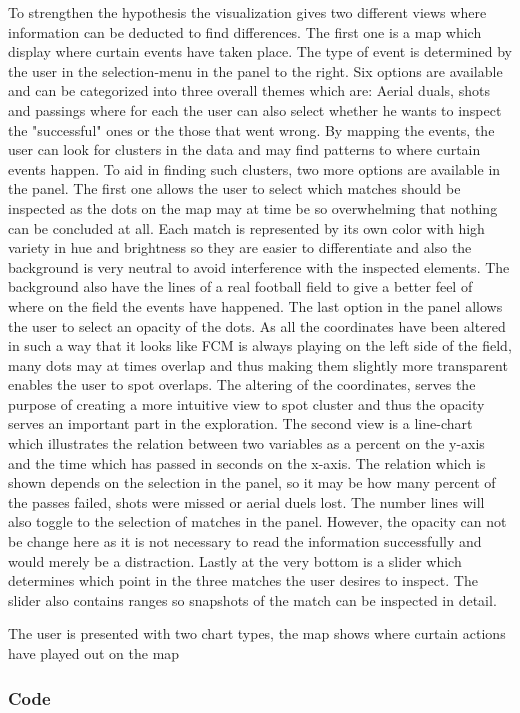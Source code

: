 \documentclass[Report.tex]{subfiles}
\begin{document}
To strengthen the hypothesis the visualization gives two different views where information can be deducted to find differences. The first one is a map which display where curtain events have taken place. The type of event is determined by the user in the selection-menu in the panel to the right. Six options are available and can be categorized into three overall themes which are: Aerial duals, shots and passings where for each the user can also select whether he wants to inspect the "successful" ones or the those that went wrong. By mapping the events, the user can look for clusters in the data and may find patterns to where curtain events happen. To aid in finding such clusters, two more options are available in the panel. The first one allows the user to select which matches should be inspected as the dots on the map may at time be so overwhelming that nothing can be concluded at all. Each match is represented by its own color with high variety in hue and brightness so they are easier to differentiate and also the background is very neutral to avoid interference with the inspected elements. The background also have the lines of a real football field to give a better feel of where on the field the events have happened. The last option in the panel allows the user to select an opacity of the dots. As all the coordinates have been altered in such a way that it looks like FCM is always playing on the left side of the field, many dots may at times overlap and thus making them slightly more transparent enables the user to spot overlaps. The altering of the coordinates, serves the purpose of creating a more intuitive view to spot cluster and thus the opacity serves an important part in the exploration. The second view is a line-chart which illustrates the relation between two variables as a percent on the y-axis and the time which has passed in seconds on the x-axis. The relation which is shown depends on the selection in the panel, so it may be how many percent of the passes failed, shots were missed or aerial duels lost. The number lines will also toggle to the selection of matches in the panel. However, the opacity can not be change here as it is not necessary to read the information successfully and would merely be a distraction. Lastly at the very bottom is a slider which determines which point in the three matches the user desires to inspect. The slider also contains ranges so snapshots of the match can be inspected in detail.















The user is presented with two chart types, the map shows where curtain actions have played out on the map 
\subsubsection*{Code}

	
\end{document}

